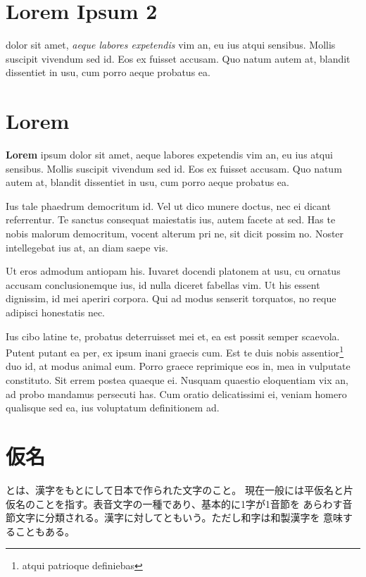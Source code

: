 \documentclass{report}
\renewcommand{\emph}[1]{\textbf{#1}}
\theoremstyle{definition}
\begin{document}
\section{Lorem Ipsum 2}

\emph{} dolor sit amet, \textit{aeque labores expetendis} vim an, eu ius atqui sensibus. Mollis suscipit vivendum sed id. Eos ex fuisset accusam. Quo natum autem at, blandit dissentiet in usu, cum porro aeque probatus ea.

\section{Lorem}

\emph{Lorem} ipsum dolor sit amet, aeque labores expetendis vim an, eu ius atqui sensibus. Mollis suscipit vivendum sed id. Eos ex fuisset accusam. Quo natum autem at, blandit dissentiet in usu, cum porro aeque probatus ea.

Ius tale phaedrum democritum id. Vel ut dico munere doctus, nec ei dicant referrentur. Te sanctus consequat maiestatis ius, autem facete at sed. Has te nobis malorum democritum, vocent alterum pri ne, sit dicit possim no. Noster intellegebat ius at, an diam saepe vis.

Ut eros admodum antiopam his. Iuvaret docendi platonem at usu, cu ornatus accusam conclusionemque ius, id nulla diceret fabellas vim. Ut his essent dignissim, id mei aperiri corpora. Qui ad modus senserit torquatos, no reque adipisci honestatis nec.

Ius cibo latine te, probatus deterruisset mei et, ea est possit semper scaevola. Putent putant ea per, ex ipsum inani graecis cum. Est te duis nobis assentior\footnote{atqui patrioque definiebas} duo id, at modus animal eum. Porro graece reprimique eos in, mea in vulputate constituto. Sit errem postea quaeque ei. Nusquam quaestio eloquentiam vix an, ad probo mandamus persecuti has. Cum oratio delicatissimi ei, veniam homero qualisque sed ea, ius voluptatum definitionem ad.


\newpage
\section{仮名} \label{sec:kana}

\emph{}とは、漢字をもとにして日本で作られた文字のこと。
現在一般には平仮名と片仮名のことを指す。表音文字の一種であり、基本的に1字が1音節を
あらわす音節文字に分類される。漢字に対してともいう。ただし和字は和製漢字を
意味することもある。
\end{document}
